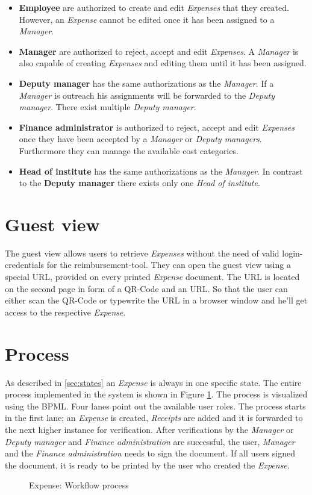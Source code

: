 \begin{itemize}
    \item \textbf{Employee} are authorized to create and edit \textit{Expenses} that they created. However, an \textit{Expense} cannot be edited once it has been assigned to a \textit{Manager}.
    
    \item \textbf{Manager} are authorized to reject, accept and edit \textit{Expenses}. A \textit{Manager} is also capable of creating \textit{Expenses} and editing them until it has been assigned.
    
    \item \textbf{Deputy manager} has the same authorizations as the \textit{Manager}. If a \textit{Manager} is outreach his assignments will be forwarded to the \textit{Deputy manager}. There exist multiple \textit{Deputy manager}.
    
    \item \textbf{Finance administrator} is authorized to reject, accept and edit \textit{Expenses} once they have been accepted by a \textit{Manager} or \textit{Deputy managers}. Furthermore they can manage the available cost categories.
    
    \item \textbf{Head of institute} has the same authorizations as the \textit{Manager}. In contrast to the \textbf{Deputy manager} there exists only one \textit{Head of institute}.
\end{itemize}

\section{Guest view}
The guest view allows users to retrieve \textit{Expenses} without the need of valid login-credentials for the reimbursement-tool. They can open the guest view using a special URL, provided on every printed \textit{Expense} document. The URL is located on the second page in form of a QR-Code and an URL. So that the user can either scan the QR-Code or typewrite the URL in a browser window and he'll get access to the respective \textit{Expense}.


\section{Process}
\label{sec:process}
As described in \ref{sec:states} an \textit{Expense} is always in one specific state. The entire process implemented in the system is shown in Figure \ref{fig:process-diagram}. The process is visualized using the BPML. Four lanes point out the available user roles. The process starts in the first lane; an \textit{Expense} is created, \textit{Receipts} are added and it is forwarded to the next higher instance for verification. After verifications by the \textit{Manager} or \textit{Deputy manager} and \textit{Finance administration} are successful, the user, \textit{Manager} and the \textit{Finance administration} needs to sign the document. If all users signed the document, it is ready to be printed by the user who created the \textit{Expense}.

\begin{figure}[H]
    \centering
    \caption{Expense: Workflow process}
    \label{fig:process-diagram}
\end{figure}
